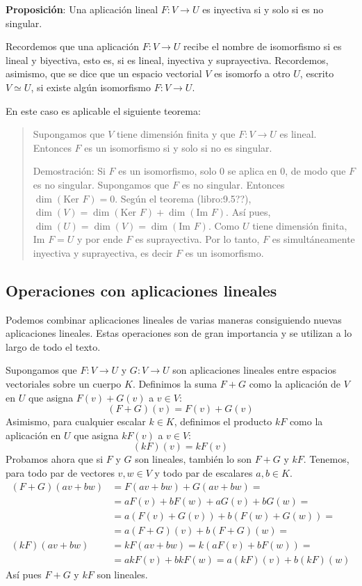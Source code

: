 \textbf{Proposición}: Una aplicación lineal \(F:V\rightarrow U\) es inyectiva si y solo si es no singular.

Recordemos que una aplicación \(F:V\rightarrow U\) recibe el nombre de isomorfismo si es lineal y biyectiva, esto es, si es lineal, inyectiva y suprayectiva. Recordemos, asimismo, que se dice que un espacio vectorial \(V\) es isomorfo a otro \(U\), escrito \(V \simeq U\), si existe algún isomorfismo \(F:V\rightarrow U\).

En este caso es aplicable el siguiente teorema:
\begin{quote}
  Supongamos que \(V\) tiene dimensión finita y que \(F:V \rightarrow U \) es lineal. Entonces \(F\) es un isomorfismo si y solo si no es singular.

  Demostración:
  Si \(F\) es un isomorfismo, solo \(0\) se aplica en \(0\), de modo que \(F\) es no singular. Supongamos que \(F\) es no singular. Entonces \(\dim(\text{Ker } F) = 0\). Según el teorema (libro:9.5??), \(\dim(V) = \dim(\text{Ker } F) + \dim(\text{Im } F)\).
  Así pues, \(\dim(U) = \dim(V) = \dim(\text{Im } F)\). Como \(U\) tiene dimensión finita, \(\text{Im } F = U\) y por ende \(F\) es suprayectiva. Por lo tanto, \(F\) es simultáneamente inyectiva y suprayectiva, es decir \(F\) es un isomorfismo.
\end{quote}

\subsection{Operaciones con aplicaciones lineales}

Podemos combinar aplicaciones lineales de varias maneras consiguiendo nuevas aplicaciones lineales. Estas operaciones son de gran importancia y se utilizan a lo largo de todo el texto.

Supongamos que \(F:V \rightarrow U\) y \(G:V \rightarrow U\) son aplicaciones lineales entre espacios vectoriales sobre un cuerpo \(K\). Definimos la suma \(F+G\) como la aplicación de \(V\) en \(U\) que asigna \(F(v) + G(v)\) a \(v\in V\):
\[
  (F+G)(v) = F(v) + G (v)
\]
Asimismo, para cualquier escalar \(k \in K\), definimos el producto \(kF\) como la aplicación en \(U\) que asigna \(kF(v)\) a \(v \in V\):
\[
  (kF)(v) = kF (v)
\]
Probamos ahora que si \(F\) y \(G\) son lineales, también lo son \(F + G\) y \(kF\). Tenemos, para todo par de vectores \(v,w \in V\) y todo par de escalares \(a,b \in K\).
\begin{align*}
  (F+G)(av + bw) &= F(av + bw) + G(av + bw) = \\
                 &=aF(v) + bF(w) + aG(v) + bG(w) = \\
                 &=a(F(v) + G(v)) + b(F(w) + G(w)) = \\
                 &=a(F+G)(v) + b(F+G)(w) =\\[3pt]
  (kF)(av + bw) &= kF(av + bw) = k(aF(v)+bF(w))= \\
                &= akF(v) + bkF(w) = a(kF)(v) + b(kF)(w)
\end{align*}
Así pues \(F+G\) y \(kF\) son lineales.

